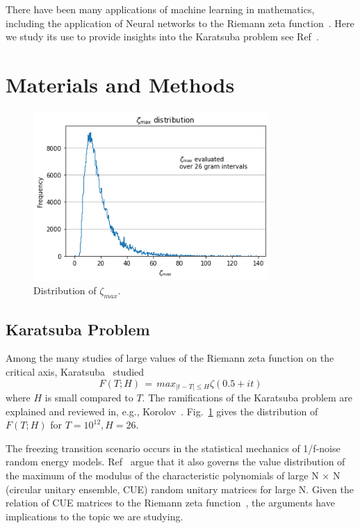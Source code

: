 \documentclass[twoside]{article}
\begin{document}
 There have been many applications of machine learning in mathematics, including 
the application of Neural networks to the Riemann zeta function~\cite{osneural}.
Here we study its use to provide insights into  the Karatsuba problem see Ref~\cite{K5, Kor1}.


\section{\label{sec2}Materials and Methods}

\begin{figure}
\centering
\includegraphics[width=0.8\textwidth]{1.png}
\caption[]{ 
  Distribution of $\zeta_{max}$. 
  }
\vspace{1mm}
\label{z1}
\end{figure}

\subsection{\label{seckaratsuba}Karatsuba Problem}

Among the many studies of large values of the Riemann zeta function on the critical axis, Karatsuba~\cite{K5} studied 
\begin{equation}
F(T; H)  \, = \, max_{|t-T| \le H} \zeta ( 0.5+it ) 
\label{eqRie}
\end{equation}
where $H$ is small compared to $T$. The ramifications of the Karatsuba problem are explained and
reviewed in, e.g.,  Korolov~\cite{Kor1}.  Fig.~\ref{z1} gives the distribution of $F(T; H)$ for $T=10^{12}, H=26$.

The freezing transition scenario occurs in the statistical mechanics of 1/f-noise random energy models. Ref~\cite{FK} argue that it  also governs the value distribution of the maximum of the modulus of the characteristic polynomials  of large N × N (circular unitary ensemble, CUE) random unitary  matrices for large N.  Given the relation of CUE matrices to the Riemann zeta function~\cite{oscue}, the arguments have implications to the topic we are studying.
\end{document}
